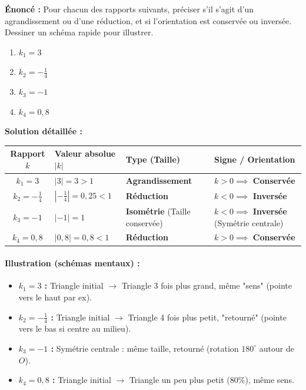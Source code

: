\documentclass[11pt]{article}
\begin{document}
\begin{exoresolu}
\textbf{Énoncé :} Pour chacun des rapports suivants, préciser s'il s'agit d'un agrandissement ou d'une réduction, et si l'orientation est conservée ou inversée. Dessiner un schéma rapide pour illustrer.
\begin{enumerate}
    \item $k_1 = 3$
    \item $k_2 = -\frac{1}{4}$
    \item $k_3 = -1$
    \item $k_4 = 0,8$
\end{enumerate}
\tcblower
\textbf{Solution détaillée :}
\begin{center}
\begin{tabularx}{\linewidth}{|c|X|X|X|}\hline
\textbf{Rapport $k$} & \textbf{Valeur absolue $|k|$} & \textbf{Type (Taille)} & \textbf{Signe / Orientation} \\ \hline
$k_1 = 3$ & $|3| = 3 > 1$ & \textbf{Agrandissement} & $k>0 \implies$ \textbf{Conservée} \\ \hline
$k_2 = -\frac{1}{4}$ & $|-\frac{1}{4}| = 0,25 < 1$ & \textbf{Réduction} & $k<0 \implies$ \textbf{Inversée} \\ \hline
$k_3 = -1$ & $|-1| = 1$ & \textbf{Isométrie} (Taille conservée) & $k<0 \implies$ \textbf{Inversée} (Symétrie centrale) \\ \hline
$k_4 = 0,8$ & $|0,8| = 0,8 < 1$ & \textbf{Réduction} & $k>0 \implies$ \textbf{Conservée} \\ \hline
\end{tabularx}
\end{center}
\paragraph{Illustration (schémas mentaux) :}
\begin{itemize}
    \item \textbf{$k_1=3$ :} Triangle initial $\to$ Triangle 3 fois plus grand, même "sens" (pointe vers le haut par ex).
    \item \textbf{$k_2=-\frac{1}{4}$ :} Triangle initial $\to$ Triangle 4 fois plus petit, "retourné" (pointe vers le bas si centre au milieu).
    \item \textbf{$k_3=-1$ :} Symétrie centrale : même taille, retourné (rotation $180^\circ$ autour de $O$).
    \item \textbf{$k_4=0,8$ :} Triangle initial $\to$ Triangle un peu plus petit (80\%), même sens.
\end{itemize}
\end{exoresolu}
\end{document}

